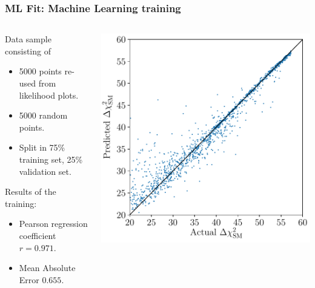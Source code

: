 \documentclass[mathserif, 10pt]{beamer}
\begin{document}
\begin{frame}\frametitle{ML Fit: Machine Learning training}

    \begin{columns}
        \begin{column}{0.5\textwidth}
            Data sample consisting of
            \begin{itemize}
                \item 5000 points re-used from likelihood plots.
                \item 5000 random points.
                \item Split in 75\% training set, 25\% validation set.
            \end{itemize}
            Results of the training:
            \begin{itemize}
                \item Pearson regression coefficient $r=0.971$.
                \item Mean Absolute Error $0.655$.
            \end{itemize}
        \end{column}
        \begin{column}{0.5\textwidth}
            \includegraphics[width=\columnwidth]{figures/regression_xgb.pdf}
        \end{column}
    \end{columns}

\end{frame}
\end{document}
